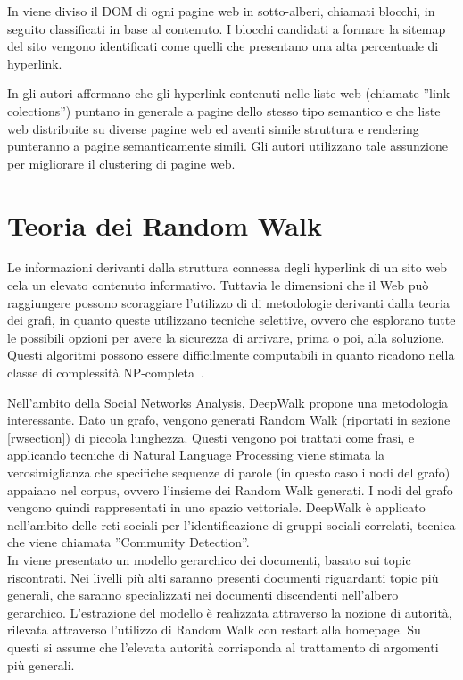In \cite{Lin11} viene diviso il DOM di ogni pagine web in sotto-alberi, chiamati blocchi, in seguito classificati in base al contenuto. I blocchi candidati a formare la sitemap del sito vengono identificati come quelli che presentano una alta percentuale di hyperlink. 

In \cite{Crescenzi05} gli autori affermano che gli hyperlink contenuti nelle liste web (chiamate ''link colections'') puntano in generale a pagine dello stesso tipo semantico e che liste web distribuite su diverse pagine web ed aventi simile struttura e rendering punteranno a pagine semanticamente simili. Gli autori utilizzano tale assunzione per migliorare il clustering di pagine web.


\section{Teoria dei Random Walk}
Le informazioni derivanti dalla struttura connessa degli hyperlink di un sito web cela un elevato contenuto informativo. Tuttavia le dimensioni che il Web può raggiungere possono scoraggiare l'utilizzo di di metodologie derivanti dalla teoria dei grafi, in quanto queste utilizzano tecniche selettive, ovvero che esplorano tutte le possibili opzioni per avere la sicurezza di arrivare, prima o poi, alla soluzione. Questi algoritmi possono essere difficilmente computabili in quanto ricadono nella classe di complessità NP-completa~\cite{Garey}.

Nell'ambito della Social Networks Analysis, DeepWalk \cite{Perozzi14} propone una metodologia interessante. Dato un grafo, vengono generati Random Walk (riportati in sezione \ref{rwsection}) di piccola lunghezza. Questi vengono poi trattati come frasi, e applicando tecniche di Natural Language Processing viene stimata la verosimiglianza che specifiche sequenze di parole (in questo caso i nodi del grafo) appaiano nel corpus, ovvero l'insieme dei Random Walk generati. I nodi del grafo vengono quindi rappresentati in uno spazio vettoriale.
DeepWalk è applicato nell'ambito delle reti sociali per l'identificazione di gruppi sociali correlati, tecnica che viene chiamata ''Community Detection''.
\\
In \cite{Weninger12} viene presentato un modello gerarchico dei documenti, basato sui topic riscontrati. Nei livelli più alti saranno presenti documenti riguardanti topic più generali, che saranno specializzati nei documenti discendenti nell'albero gerarchico. 
L'estrazione del modello è realizzata attraverso la nozione di autorità, rilevata attraverso l'utilizzo di Random Walk con restart alla homepage. Su questi si assume che l'elevata autorità corrisponda al trattamento di argomenti più generali.


